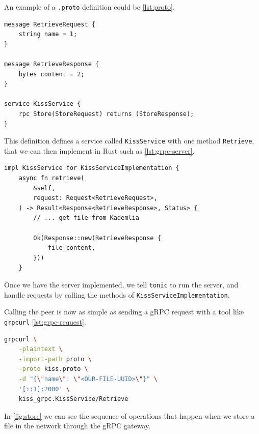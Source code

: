 An example of a \texttt{.proto} definition could be \autoref{lst:proto}.

\begin{lstlisting}[caption={Example of a .proto file}, label={lst:proto}]
message RetrieveRequest {
    string name = 1;
}

message RetrieveResponse {
    bytes content = 2;
}

service KissService {
    rpc Store(StoreRequest) returns (StoreResponse);
}
\end{lstlisting}

This definition defines a service called \texttt{KissService} with one method \texttt{Retrieve},
that we can then implement in Rust such as \autoref{lst:grpc-server}.

\begin{lstlisting}[caption={Example of a gRPC server implementation}, label={lst:grpc-server}]
impl KissService for KissServiceImplementation {
    async fn retrieve(
        &self,
        request: Request<RetrieveRequest>,
    ) -> Result<Response<RetrieveResponse>, Status> {
        // ... get file from Kademlia

        Ok(Response::new(RetrieveResponse {
            file_content,
        }))
    }

\end{lstlisting}

Once we have the server implemented, we tell \texttt{tonic} to run the server,
and handle requests by calling the methods of \texttt{KissServiceImplementation}.

Calling the peer is now as simple as sending a gRPC request with a tool like \texttt{grpcurl} \autoref{lst:grpc-request}.

\begin{lstlisting}[language=bash, caption={Example of a gRPC request}, label={lst:grpc-request}]
    grpcurl \
    -plaintext \
    -import-path proto \
    -proto kiss.proto \
    -d "{\"name\": \"<OUR-FILE-UUID>\"}" \
    '[::1]:2000' \
    kiss_grpc.KissService/Retrieve
\end{lstlisting}

In \autoref{fig:store} we can see the sequence of operations that happen
when we store a file in the network through the gRPC gateway.

